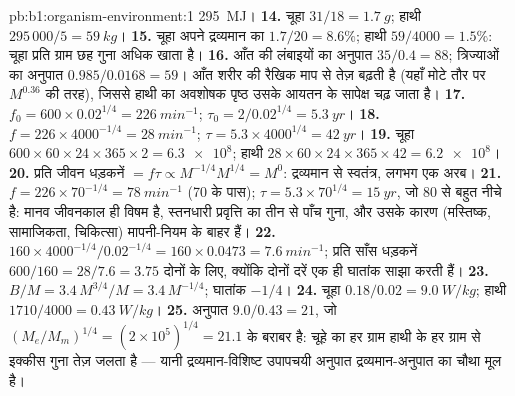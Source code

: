 \begin{solution}{pb:b1:organism-environment:1}
\qty{295}{MJ}।
\textbf{14.} चूहा $31/18 = \qty{1.7}{g}$; हाथी
$295\,000/5 = \qty{59}{kg}$।
\textbf{15.} चूहा अपने द्रव्यमान का $1.7/20 = 8.6\%$; हाथी $59/4000 =
1.5\%$: चूहा प्रति ग्राम छह गुना अधिक खाता है।
\textbf{16.} आँत की लंबाइयों का अनुपात $35/0.4 = 88$; त्रिज्याओं का
अनुपात $0.985/0.0168
= 59$। आँत शरीर की रैखिक माप से तेज़ बढ़ती है (यहाँ
मोटे तौर पर $M^{0.36}$ की तरह), जिससे हाथी का अवशोषक पृष्ठ उसके आयतन के
सापेक्ष चढ़ जाता है।
\textbf{17.} $f_0 = 600\times 0.02^{1/4} = \qty{226}{min^{-1}}$;
$\tau_0 = 2/0.02^{1/4} = \qty{5.3}{yr}$।
\textbf{18.} $f = 226\times 4000^{-1/4} = \qty{28}{min^{-1}}$; $\tau =
5.3\times 4000^{1/4} = \qty{42}{yr}$।
\textbf{19.} चूहा $600\times 60\times 24\times 365\times 2 =
\num{6.3e8}$; हाथी $28\times 60\times 24\times 365\times 42 =
\num{6.2e8}$।
\textbf{20.} प्रति जीवन धड़कनें $= f\tau \propto M^{-1/4}M^{1/4} = M^0$:
द्रव्यमान से स्वतंत्र, लगभग एक अरब।
\textbf{21.} $f = 226\times 70^{-1/4} = \qty{78}{min^{-1}}$ (70 के
पास); $\tau = 5.3\times 70^{1/4} = \qty{15}{yr}$, जो 80 से बहुत नीचे है:
मानव जीवनकाल ही विषम है, स्तनधारी प्रवृत्ति का तीन से पाँच गुना, और उसके
कारण (मस्तिष्क, सामाजिकता, चिकित्सा) मापनी-नियम के बाहर हैं।
\textbf{22.} $160\times 4000^{-1/4}/0.02^{-1/4} = 160\times 0.0473 =
\qty{7.6}{min^{-1}}$; प्रति साँस धड़कनें $600/160 = 28/7.6 = 3.75$
दोनों के लिए, क्योंकि दोनों दरें एक ही घातांक साझा करती हैं।
\textbf{23.} $B/M = 3.4\,M^{3/4}/M = 3.4\,M^{-1/4}$; घातांक $-1/4$।
\textbf{24.} चूहा $0.18/0.02 = \qty{9.0}{W/kg}$; हाथी $1710/4000 =
\qty{0.43}{W/kg}$।
\textbf{25.} अनुपात $9.0/0.43 = 21$, जो $(M_e/M_m)^{1/4} =
(2\times 10^5)^{1/4} = 21.1$ के बराबर है: चूहे का हर ग्राम हाथी के हर
ग्राम से इक्कीस गुना तेज़ जलता है --- यानी द्रव्यमान-विशिष्ट उपापचयी
अनुपात द्रव्यमान-अनुपात का चौथा मूल है।
\end{solution}
